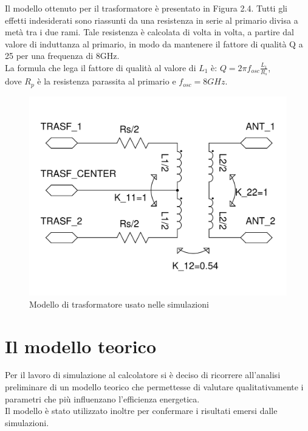 \documentclass[a4paper, 12pt]{memoir}
\begin{document}
Il modello ottenuto per il trasformatore è presentato in Figura 2.4.
Tutti gli effetti indesiderati sono riassunti da una resistenza in serie al
primario divisa a metà tra i due rami. Tale resistenza è calcolata di volta in
volta, a partire dal valore di induttanza al primario, in modo da mantenere il
fattore di qualità Q a 25 per una frequenza di 8GHz.\\
La formula che lega il fattore di qualità al valore di $L_1$ è:
$ Q = 2\pi f_{osc} \frac{L_1}{R_s} $,\\
dove $R_p$ è la resistenza parassita al primario e $ f_{osc}=8GHz $.
\begin{figure}[h]
\centering
\includegraphics[height=0.34\textheight]{images/trasf_model.pdf}
\caption{Modello di trasformatore usato nelle simulazioni}
\end{figure}
\clearpage %

\section{Il modello teorico}
Per il lavoro di simulazione al calcolatore si è deciso di ricorrere 
all'analisi preliminare di un modello teorico che permettesse di valutare
qualitativamente i parametri che più influenzano l'efficienza energetica.\\
Il modello è stato utilizzato inoltre per confermare i risultati emersi dalle
simulazioni.
\end{document}
